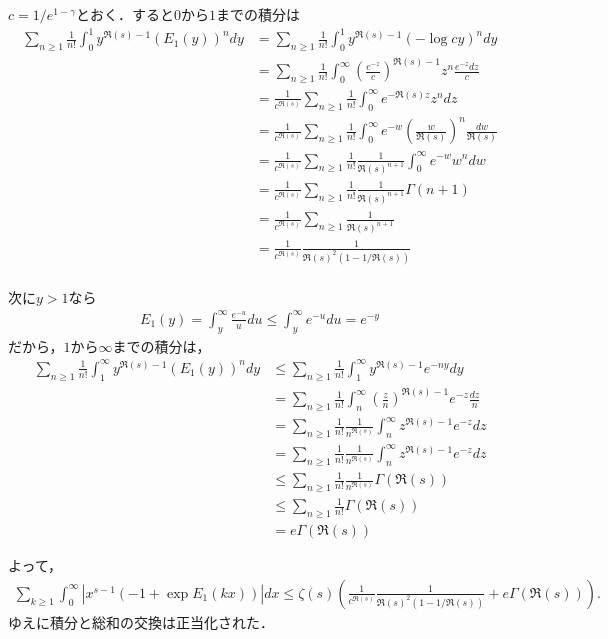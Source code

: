 \documentclass{jsarticle}
\theoremstyle{definition}
\begin{document}
$c = 1/e^{1-\gamma}$とおく．すると$0$から$1$までの積分は
\begin{align*}
\sum_{n \ge 1} \frac{1}{n!} \int_0^1 y^{\Re(s)-1} (E_1(y))^n dy
&= \sum_{n \ge 1} \frac{1}{n!} \int_0^1 y^{\Re(s)-1} (- \log cy)^n dy \\
&= \sum_{n \ge 1} \frac{1}{n!} \int_0^\infty  \left(\frac{e^{-z}}{c}\right)^{\Re(s)-1} z^n \frac{e^{-z}dz}{c} \\
&= \frac{1}{c^{\Re(s)}}\sum_{n \ge 1} \frac{1}{n!} \int_0^\infty  e^{-\Re(s) z} z^n dz \\
&= \frac{1}{c^{\Re(s)}}\sum_{n \ge 1} \frac{1}{n!} \int_0^\infty  e^{-w} \left(\frac{w}{\Re(s)}\right)^n \frac{dw}{\Re(s)} \\
&= \frac{1}{c^{\Re(s)}}\sum_{n \ge 1} \frac{1}{n!} \frac{1}{\Re(s)^{n+1}} \int_0^\infty  e^{-w} w^n dw \\
&= \frac{1}{c^{\Re(s)}}\sum_{n \ge 1} \frac{1}{n!} \frac{1}{\Re(s)^{n+1}} \Gamma(n+1) \\
&= \frac{1}{c^{\Re(s)}}\sum_{n \ge 1} \frac{1}{\Re(s)^{n+1}}  \\
&= \frac{1}{c^{\Re(s)}} \frac{1}{\Re(s)^2 (1-1/\Re(s))}  \\
\end{align*}

次に$y > 1$なら
\begin{align*}
E_1(y) = \int_{y}^\infty \frac{e^{-u}}{u} du \le \int_{y}^\infty e^{-u} du = e^{-y}
\end{align*}
だから，$1$から$\infty$までの積分は，
\begin{align*}
\sum_{n \ge 1} \frac{1}{n!} \int_1^\infty y^{\Re(s)-1} (E_1(y))^n dy
&\le \sum_{n \ge 1} \frac{1}{n!} \int_1^\infty y^{\Re(s)-1} e^{-ny} dy \\
&= \sum_{n \ge 1} \frac{1}{n!} \int_n^\infty \left(\frac{z}{n}\right)^{\Re(s)-1} e^{-z} \frac{dz}{n} \\
&= \sum_{n \ge 1} \frac{1}{n!} \frac{1}{n^{\Re(s)}}\int_n^\infty z^{\Re(s)-1} e^{-z} dz \\
&= \sum_{n \ge 1} \frac{1}{n!} \frac{1}{n^{\Re(s)}}\int_n^\infty z^{\Re(s)-1} e^{-z} dz \\
&\le \sum_{n \ge 1} \frac{1}{n!} \frac{1}{n^{\Re(s)}} \Gamma(\Re(s)) \\
&\le \sum_{n \ge 1} \frac{1}{n!} \Gamma(\Re(s)) \\
&= e \Gamma(\Re(s))
\end{align*}

よって，
\begin{align*}
\sum_{k \ge 1} \int_0^\infty \left|x^{s-1} \left(-1 + \exp E_1(k x) \right)\right| dx
\le \zeta(s) \left(\frac{1}{c^{\Re(s)}} \frac{1}{\Re(s)^2 (1-1/\Re(s))} + e \Gamma(\Re(s))\right).
\end{align*}
ゆえに積分と総和の交換は正当化された．
\end{document}
